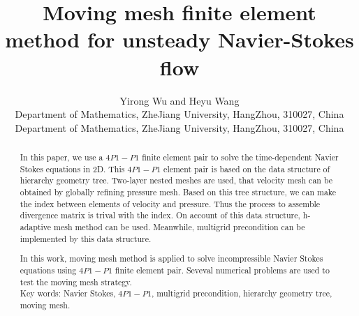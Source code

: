 \documentclass[a4paper, 11pt]{article}
\title{Moving mesh finite element method for unsteady Navier-Stokes flow
  } %
\author{Yirong Wu and Heyu Wang \\
  \small Department of Mathematics, ZheJiang University, HangZhou,
  310027, China\\
  \small Department of Mathematics, ZheJiang University, HangZhou,
  310027, China }
\begin{document}
\maketitle %



\begin{abstract}
    In this paper, we use a $4P1-P1$ finite element pair to solve
    the time-dependent Navier Stokes equations in 2D. This 
    $4P1-P1$ element pair is based on the data structure of hierarchy
    geometry tree. Two-layer nested meshes are used, that velocity
    mesh can be obtained by globally refining pressure mesh. Based on
    this tree structure, we can make the index between elements of
    velocity and pressure. Thus the process to assemble
    divergence matrix is trival with the index. On account of this data
    structure, h-adaptive mesh method can be used. Meanwhile,
    multigrid precondition can be implemented by this data structure. 

    In this work, moving mesh method is applied to solve
    incompressible Navier Stokes equations using $4P1-P1$ finite
    element pair. Seveval numerical problems are used to test the
    moving mesh strategy. \\
    
    Key words: Navier Stokes, $4P1-P1$, multigrid precondition,
    hierarchy geometry tree, moving mesh.

\end{abstract}
\end{document}
